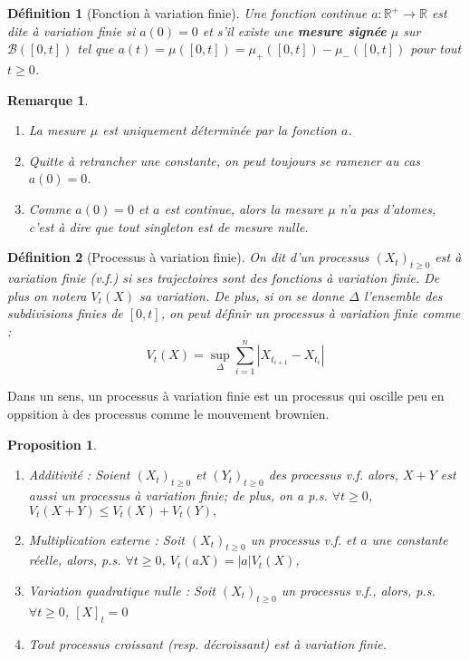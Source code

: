 \documentclass[openany]{book}
\newcommand{\R}{\mathbb{R}}
\newcommand{\1}{\mathbbm{1}}
\theoremstyle{thmfont}
\theoremstyle{deffont}
\newtheorem{definition}[definition]{Définition}
\theoremstyle{thmfont}
\newtheorem{prop}[prop]{Proposition}
\theoremstyle{deffont}
\newtheorem{remark}[remark]{Remarque}
\begin{document}
\begin{definition}[Fonction à variation finie] Une fonction continue $a : \R^+ \rightarrow \R$ est dite \textit{à variation finie} si $a(0) = 0$ et s'il existe une \textbf{mesure
    signée} $\mu$ sur $\mathcal B([0,t])$ tel que $a(t) = \mu([0,t]) = \mu_+([0,t]) - \mu_-([0,t])$ pour tout $t \geq 0$.
\label{def:fct_var_finie}
\end{definition}

\begin{remark}
  \begin{enumerate}
  \item La mesure $\mu$ est uniquement déterminée par la fonction $a$.
  \item Quitte à retrancher une constante, on peut toujours se ramener au cas $a(0) = 0$.
  \item Comme $a(0) = 0$ et $a$ est continue, alors la mesure $\mu$ n'a pas d'\textit{atomes}, c'est à dire que tout singleton est de mesure nulle.
  \end{enumerate}
\end{remark}

\begin{definition}[Processus à variation finie]
  On dit d'un processus $(X_t)_{t\geq0}$ est \textit{à variation finie} (v.f.) si ses trajectoires sont des fonctions à variation finie. De plus on notera $V_t(X)$ sa variation. De plus, si on se donne $\Delta$ l'ensemble des subdivisions finies de $[0,t]$, on peut définir un processus à variation finie comme :
%
  $$V_t(X) = \sup_{\Delta} \sum_{i=1}^n |X_{t_{i+1}} - X_{t_{i}}|$$
\end{definition}

Dans un sens, un processus à variation finie est un processus qui oscille peu en oppsition à des processus comme le mouvement brownien. 

\begin{prop}
  \begin{enumerate}[nosep]
  \item Additivité : Soient $(X_t)_{t\geq0}$ et $(Y_t)_{t\geq0}$ des processus v.f. alors, $X+Y$ est aussi un processus à variation finie; de plus, on a p.s. $\forall t \geq 0$, $V_t(X+Y) \leq V_t(X)+V_t(Y),$
  \item Multiplication externe : Soit $(X_t)_{t\geq0}$ un processus v.f. et $a$ une constante réelle, alors, p.s. $\forall t\geq0$, $V_t(aX) = |a| V_t(X)$,
  \item Variation quadratique nulle : Soit $(X_t)_{t\geq0}$ un processus v.f., alors, p.s. $\forall t \geq 0$, $[X]_t=0$
  \item Tout processus croissant (resp. décroissant) est à variation finie.
  \end{enumerate}
\end{prop}
\end{document}
